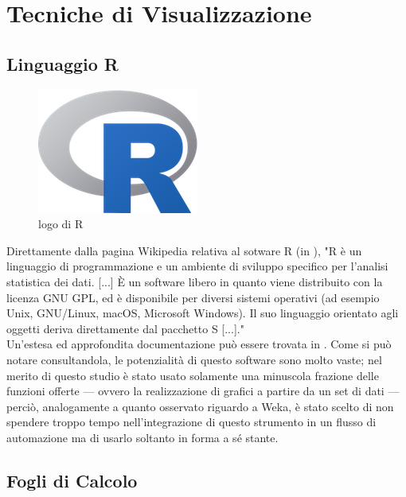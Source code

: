 \section{Tecniche di Visualizzazione}

    \subsection{Linguaggio R}

        \begin{figure}
            \centering
            \caption{logo di R}
            \label{R}
    	    \includegraphics[scale=0.70]{img/R.png}
        \end{figure}

        Direttamente dalla pagina Wikipedia relativa al sotware R (in \cite{Rwiki}), "R è un linguaggio di programmazione e un ambiente di sviluppo specifico per l'analisi statistica dei dati. [...] È un software libero in quanto viene distribuito con la licenza GNU GPL, ed è disponibile per diversi sistemi operativi (ad esempio Unix, GNU/Linux, macOS, Microsoft Windows). Il suo linguaggio orientato agli oggetti deriva direttamente dal pacchetto S [...]." \\

        Un'estesa ed approfondita documentazione può essere trovata in \cite{R}. Come si può notare consultandola, le potenzialità di questo software sono molto vaste; nel merito di questo studio è stato usato solamente una minuscola frazione delle funzioni offerte --- ovvero la realizzazione di grafici a partire da un set di dati --- perciò, analogamente a quanto osservato riguardo a Weka, è stato scelto di non spendere troppo tempo nell'integrazione di questo strumento in un flusso di automazione ma di usarlo soltanto in forma a sé stante.\\

    \subsection{Fogli di Calcolo}


